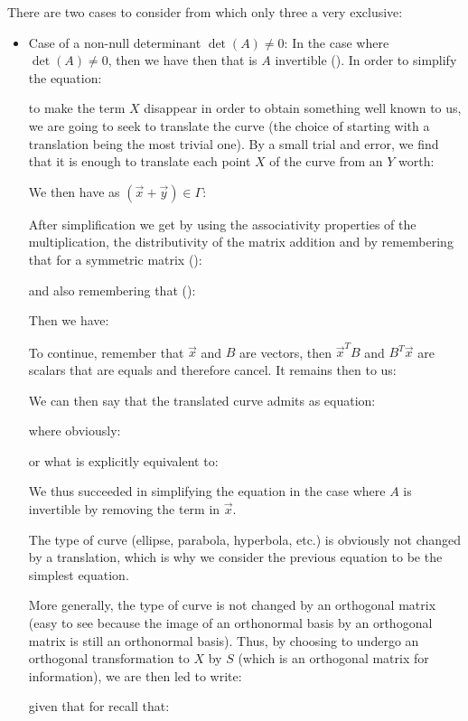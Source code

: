 	There are two cases to consider from which only three a very exclusive:
	\begin{itemize}
		\item Case of a non-null determinant $\det(A)\neq 0$:
		In the case where $\det(A)\neq 0$, then we have then that is $A$ invertible (). In order to simplify the equation:
		
	 	to make the term $X$ disappear in order to obtain something well known to us, we are going to seek to translate the curve (the choice of starting with a translation being the most trivial one). By a small trial and error, we find that it is enough to translate each point $X$ of the curve from an $Y$ worth:
		
		We then have as $(\vec{x}+\vec{y})\in \Gamma$:
		
	 	After simplification we get by using the associativity properties of the multiplication, the distributivity of the matrix addition and by remembering that for a symmetric matrix ():
		
		and also remembering that ():
		
		Then we have:
		
		To continue, remember that $\vec{x}$ and $B$ are vectors, then $\vec{x}^TB$ and $B^T\vec{x}$ are scalars that are equals and therefore cancel. It remains then to us:
		
		We can then say that the translated curve admits as equation:
	
	where obviously:
	
 	or what is explicitly equivalent to:
	
	We thus succeeded in simplifying the equation in the case where $A$ is invertible by removing the term in $\vec{x}$.

	The type of curve (ellipse, parabola, hyperbola, etc.) is obviously not changed by a translation, which is why we consider the previous equation to be the simplest equation.

	More generally, the type of curve is not changed by an orthogonal matrix (easy to see because the image of an orthonormal basis by an orthogonal matrix is still an orthonormal basis). Thus, by choosing to undergo an orthogonal transformation to $X$ by $S$ (which is an orthogonal matrix for information), we are then led to write:
	
	given that for recall that:
	

\end{itemize}
